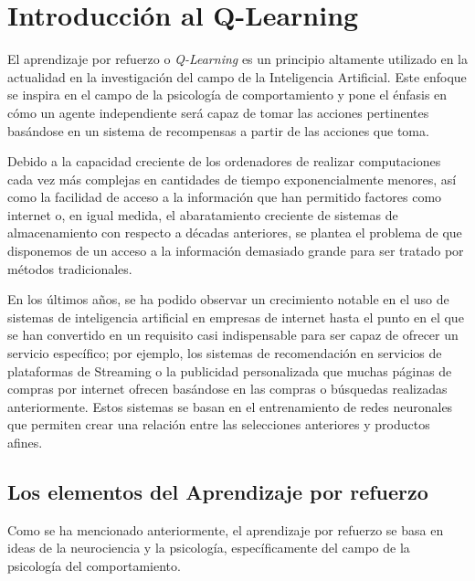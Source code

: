 \documentclass[11pt,spanish,listoffigures,listoftables]{tfgetsinf}
\begin{document}
\section{Introducción al Q-Learning}

El aprendizaje por refuerzo o \textit{Q-Learning} es un principio altamente utilizado en la actualidad en la investigación del campo de la Inteligencia Artificial. Este enfoque se inspira en el campo de la psicología de comportamiento y pone el énfasis en cómo un agente independiente será capaz de tomar las acciones pertinentes basándose en un sistema de recompensas a partir de las acciones que toma. \par 

Debido a la capacidad creciente de los ordenadores de realizar computaciones cada vez más complejas en cantidades de tiempo exponencialmente menores, así como la facilidad de acceso a la información que han permitido factores como internet o, en igual medida, el abaratamiento creciente de sistemas de almacenamiento con respecto a décadas anteriores, se plantea el problema de que disponemos de un acceso a la información demasiado grande para ser tratado por métodos tradicionales. 

En los últimos años, se ha podido observar un crecimiento notable en el uso de sistemas de inteligencia artificial en empresas de internet hasta el punto en el que se han convertido en un requisito casi indispensable para ser capaz de ofrecer un servicio específico; por ejemplo, los sistemas de recomendación en servicios de plataformas de Streaming o la publicidad personalizada que muchas páginas de compras por internet ofrecen basándose en las compras o búsquedas realizadas anteriormente. Estos sistemas se basan en el entrenamiento de redes neuronales que permiten crear una relación entre las selecciones anteriores y productos afines.

\subsection{Los elementos del Aprendizaje por refuerzo}

Como se ha mencionado anteriormente, el aprendizaje por refuerzo se basa en ideas de la neurociencia y la psicología, específicamente del campo de la psicología del comportamiento. 

\end{document}
